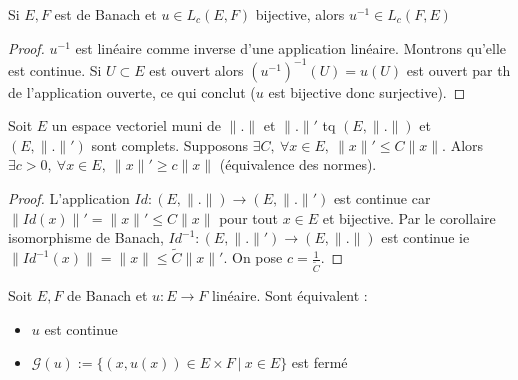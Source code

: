 \begin{corollaire}
    Si $E,F$ est de Banach et $u\in L_c(E,F)$ bijective, alors $u^{-1} \in L_c(F,E)$
\end{corollaire}
\begin{proof}
    $u^{-1} $ est linéaire comme inverse d'une application linéaire. Montrons qu'elle est continue. Si $U\subset E$ est ouvert alors $(u^{-1})^{-1} (U)=u(U) $ est ouvert par th de l'application ouverte, ce qui conclut ($u$ est bijective donc surjective).
\end{proof}
\begin{corollaire}
    Soit $E$ un espace vectoriel muni de $\|.\|$ et $\|.\|'$ tq $(E,\|.\|)$ et $(E,\|.\|')$ sont complets. Supposons $\exists C,\ \forall x\in E,\ \|x\|'\le C\|x\|. $ Alors $\exists c>0,\ \forall x\in E,\ \|x\|'\ge  c\|x\| $ (équivalence des normes).
\end{corollaire}
\begin{proof}
    L'application $Id:(E,\|.\|)\to (E,\|.\|')$ est continue car $\|Id(x)\|'=\|x\|'\le C\|x\|$ pour tout $x\in E$ et bijective. Par le corollaire isomorphisme de Banach, $Id^{-1} : (E,\|.\|')\to (E,\|.\|)$ est continue ie $\|Id^{-1} (x)\|=\|x\|\le \tilde{C}\|x\|'.$ On pose $c=\frac{1}{\tilde{C}}$.
\end{proof}
\begin{theoreme}
    Soit $E,F$ de Banach et $u:E\to F$ linéaire. Sont équivalent :
    \begin{itemize}
        \item $u$ est continue
        \item $\mathcal{G}(u):=\{(x,u(x))\in E\times F\ |\ x\in E\} $ est fermé
    \end{itemize}
\end{theoreme}
